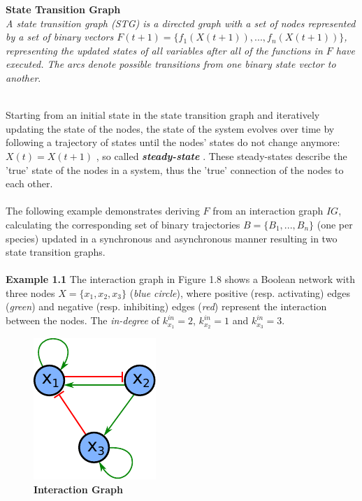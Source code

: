 \begin{defn}\textbf{State Transition Graph}\\
\textit{A state transition graph (\gls{STG}) is a directed graph with a set of nodes represented by a set of binary vectors $F(t+1)=\{ f_{1}(X(t+1)),...,f_{n}(X(t+1))\}$, representing the updated states of all variables after all of the functions in $F$ have executed. The arcs denote possible transitions from one binary state vector to another}.
\end{defn}
\citep{Saadatpour.2013, Lee.2002, HannesKlarner.}
\\
Starting from an initial state in the state transition graph and iteratively updating the state of the nodes, the state of the system evolves over time by following a trajectory of states until the nodes' states do not change anymore: $X(t)=X(t+1)$ , so called \textbf{\textit{steady-state}} \citep{Saadatpour.2013, Liang.1998}. These steady-states describe the 'true' state of the nodes in a system, thus the 'true' connection of the nodes to each other. 
\\\\
The following example demonstrates deriving $F$ from an interaction graph $IG$, calculating the corresponding set of binary trajectories $B=\{B_{1},...,B_{n}\}$ (one per species) updated in a synchronous and asynchronous manner resulting in two state transition graphs.
\\\\
\textbf{Example 1.1} The interaction graph in Figure 1.8 shows a Boolean network with three nodes $X=\{x_{1},x_{2},x_{3}\}$ (\textit{blue circle}), where positive (resp. activating) edges (\textit{green}) and negative (resp. inhibiting) edges (\textit{red}) represent the interaction between the nodes. The \textit{in-degree} of $k^{in}_{x_{1}}=2$, $k^{in}_{x_{2}}=1$ and $k^{in}_{x_{3}}=3$.

 
\begin{figure}[H]
\centering
\includegraphics[scale=1.2]{./Bilder/examplenetwork.pdf}
\caption[Interaction Graph]{\textbf{Interaction Graph}}
\label{fig:IG}
\end{figure}


